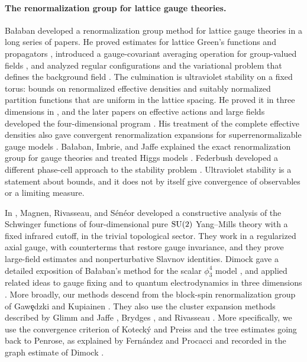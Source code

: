 \paragraph{The renormalization group for lattice gauge theories.}
Bałaban developed a renormalization group method for lattice gauge theories in a long series of papers. He proved estimates for lattice Green's functions and propagators \cite{Balaban1983Green,Balaban1984I,Balaban1984II,Balaban1985Background}, introduced a gauge-covariant averaging operation for group-valued fields \cite{Balaban1985Averaging}, and analyzed regular configurations and the variational problem that defines the background field \cite{Balaban1985Regular,Balaban1985Variational}. The culmination is ultraviolet stability on a fixed torus: bounds on renormalized effective densities and suitably normalized partition functions that are uniform in the lattice spacing. He proved it in three dimensions in \cite{Balaban1985UV}, and the later papers on effective actions and large fields developed the four-dimensional program \cite{Balaban1987RGI,Balaban1988RGII,Balaban1989LargeI,Balaban1989LargeII}. His treatment of the complete effective densities also gave convergent renormalization expansions for superrenormalizable gauge models \cite{Balaban1988Convergent}. Bałaban, Imbrie, and Jaffe explained the exact renormalization group for gauge theories and treated Higgs models \cite{Balaban1984d,Balaban1985f,BalabanJaffe1986,Balaban1988c}. Federbush developed a different phase-cell approach to the stability problem \cite{Federbush1986,Federbush1987a,Federbush1987b,FederbushWilliamson1987,Federbush1988,Federbush1990}. Ultraviolet stability is a statement about bounds, and it does not by itself give convergence of observables or a limiting measure.

In \cite{MagnenRivasseauSeneor1993}, Magnen, Rivasseau, and S\'en\'eor developed a constructive analysis of the Schwinger functions of four-dimensional pure $\mathrm{SU}(2)$ Yang--Mills theory with a fixed infrared cutoff, in the trivial topological sector. They work in a regularized axial gauge, with counterterms that restore gauge invariance, and they prove large-field estimates and nonperturbative Slavnov identities. Dimock gave a detailed exposition of Bałaban's method for the scalar $\phi^4_3$ model \cite{Dimock2013v2,Dimock2013Large,Dimock2014Convergence}, and applied related ideas to gauge fixing and to quantum electrodynamics in three dimensions \cite{Dimock2015Axial,Dimock2015b,Dimock2018,Dimock2020}. More broadly, our methods descend from the block-spin renormalization group of Gaw\c{e}dzki and Kupiainen \cite{GawedzkiKupiainen1980,GawedzkiKupiainen1983a,GawedzkiKupiainen1986}. They also use the cluster expansion methods described by Glimm and Jaffe \cite{GlimmJaffe1987}, Brydges \cite{Brydges1986,Brydges2009}, and Rivasseau \cite{Rivasseau1991}. More specifically, we use the convergence criterion of Koteck\'y and Preiss \cite{KoteckyPreiss1986} and the tree estimates going back to Penrose, as explained by Fern\'andez and Procacci \cite{FernandezProcacci2007} and recorded in the graph estimate of Dimock \cite{Dimock2013v2}.


